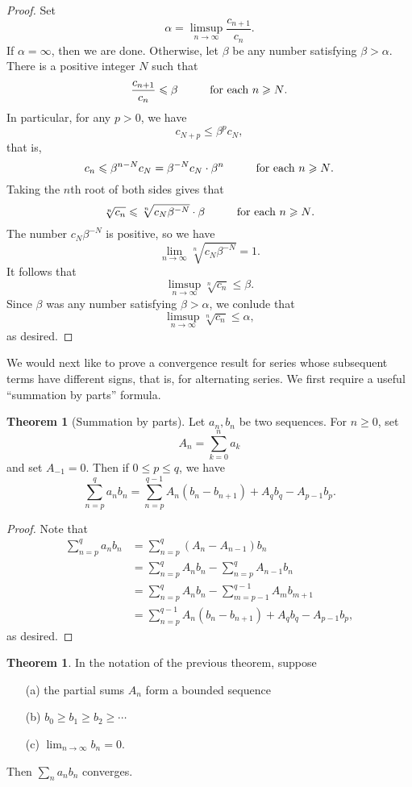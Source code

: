 \documentclass[12pt]{article}
\theoremstyle{definition}
\theoremstyle{theorem}
\newtheorem{theorem}[definition]{Theorem}
\begin{document}
\begin{proof}
Set 
\[
\alpha = \limsup_{n\to \infty}\frac{c_{n+1}}{c_n}.
\]
If $\alpha = \infty$, then we are done. Otherwise, let $\beta$ be any number satisfying $\beta > \alpha$. There is a positive integer $N$ such that 
\[
\frac{c_{n+1}}{c_n} \leqslant \beta \hspace{10mm} \text{for each $n \geqslant N$}. 
\] 
In particular, for any $p > 0$, we have 
\[
c_{N+p} \leqslant \beta^p c_N,
\]
that is, 
\[
c_n \leqslant \beta^{n-N} c_N = \beta^{-N}c_N \cdot \beta^n \hspace{10mm} \text{for each $n \geqslant N$}. 
\]
Taking the $n$th root of both sides gives that 
\[
\sqrt[n]{c_n} \leqslant \sqrt[n]{c_N \beta^{-N}} \cdot \beta \hspace{10mm} \text{for each $n \geqslant N$}. 
\]
The number $c_N \beta^{-N}$ is positive, so we have 
\[
\lim_{n \to \infty} \sqrt[n]{c_N \beta^{-N}} = 1.
\]
It follows that 
\[
\limsup_{n \to \infty} \sqrt[n]{c_n} \leqslant \beta.
\]
Since $\beta$ was any number satisfying $\beta > \alpha$, we conlude that 
\[
\limsup_{n \to \infty} \sqrt[n]{c_n} \leqslant \alpha,
\]
as desired. 
\end{proof}

We would next like to prove a convergence result for series whose subsequent terms have different signs, that is, for alternating series. We first require a useful ``summation by parts'' formula. 

\begin{theorem}[Summation by parts]
Let $a_n, b_n$ be two sequences. For $n \geqslant 0$, set 
\[
A_n = \sum_{k=0}^n a_k
\]
and set $A_{-1} = 0$. Then if $0 \leqslant p \leqslant q$, we have 
\[
\sum_{n=p}^q a_nb_n = \sum_{n=p}^{q-1} A_n(b_n - b_{n+1}) + A_qb_q - A_{p-1}b_p.
\]
\end{theorem}

\begin{proof}
Note that 
\begin{align*}
\sum_{n=p}^q a_nb_n &= \sum_{n=p}^q (A_n - A_{n-1})b_n \\
&= \sum_{n=p}^q A_n b_n - \sum_{n=p}^q A_{n-1}b_n \\
&= \sum_{n=p}^q A_n b_n - \sum_{m=p-1}^{q-1} A_m b_{m+1} \\
&= \sum_{n=p}^{q-1} A_n(b_n - b_{n+1}) + A_qb_q - A_{p-1}b_p,
\end{align*}
as desired. 
\end{proof}

\begin{theorem}
In the notation of the previous theorem, suppose 
\begin{enumerate}
\item[(a)] the partial sums $A_n$ form a bounded sequence
\item[(b)] $b_0 \geqslant b_1 \geqslant b_2 \geqslant \cdots$ 
\item[(c)] $\lim_{n \to \infty} b_n = 0$.
\end{enumerate}
Then $\sum_{n}a_nb_n$ converges. 
\end{theorem}
\end{document}
